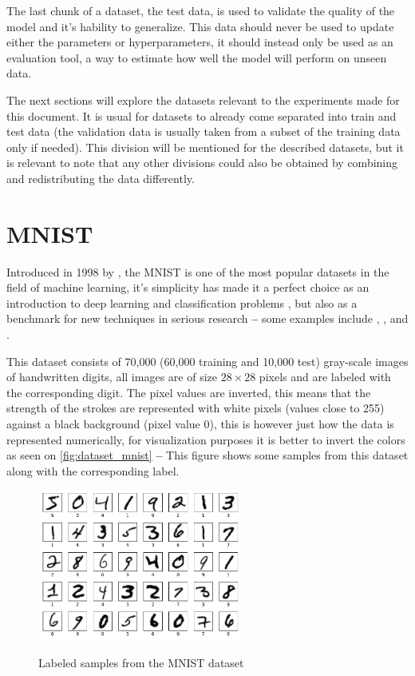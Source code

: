 The last chunk of a dataset, the test data, is used to validate the quality of the model and it's hability to generalize. This data should never be used to update either the parameters or hyperparameters, it should instead only be used as an evaluation tool, a way to estimate how well the model will perform on unseen data.

The next sections will explore the datasets relevant to the experiments made for this document. It is usual for datasets to already come separated into train and test data (the validation data is usually taken from a subset of the training data only if needed). This division will be mentioned for the described datasets, but it is relevant to note that any other divisions could also be obtained by combining and redistributing the data differently.


\section{MNIST} \label{sec:mnist}
Introduced in 1998 by \textcite{mnist1998}, the \gls{MNIST} is one of the most popular datasets in the field of machine learning, it's simplicity has made it a perfect choice as an introduction to deep learning and classification problems \cite{NN&DL2015}, but also as a benchmark for new techniques in serious research \textbf{--} some examples include \cite{dropout2012}, \cite{gans2014}, \cite{conditionalGAN2014} and \cite{adam2017}.

This dataset consists of 70,000 (60,000 training and 10,000 test) gray-scale images of handwritten digits, all images are of size $28{\times}28$ pixels and are labeled with the corresponding digit. The pixel values are inverted, this means that the strength of the strokes are represented with white pixels (values close to 255) against a black background (pixel value 0), this is however just how the data is represented numerically, for visualization purposes it is better to invert the colors as seen on \autoref{fig:dataset_mnist} \textbf{--} This figure shows some samples from this dataset along with the corresponding label.
\begin{figure}[hbt]
    \centering
    \caption{Labeled samples from the MNIST dataset}
    \includegraphics[width=0.6\textwidth]{chapters/Datasets/figures/MNIST.pdf}
    \label{fig:dataset_mnist}
\end{figure}



